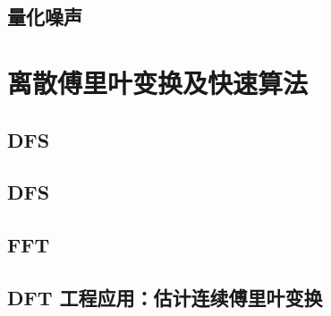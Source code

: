 \documentclass[en,11pt,english,black,simple,device=ppt]{elegantbook}
\begin{document}


\section{量化噪声}



\chapter{离散傅里叶变换及快速算法}

\section{DFS}



\section{DFS}



\section{FFT}




\section{DFT 工程应用：估计连续傅里叶变换}


\end{document}

